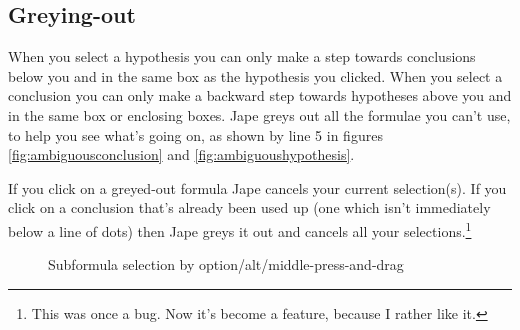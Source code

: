 \documentclass[11pt]{book}
\begin{document}
\subsection{Greying-out}

When you select a hypothesis you can only make a step towards conclusions below you and in the same box as the hypothesis you clicked. When you select a conclusion you can only make a backward step towards hypotheses above you and in the same box or enclosing boxes. Jape greys out all the formulae you can't use, to help you see what's going on, as shown by line 5 in figures \ref{fig:ambiguousconclusion} and \ref{fig:ambiguoushypothesis}. 

If you click on a greyed-out formula Jape cancels your current selection(s). If you click on a conclusion that's already been used up (one which isn't immediately below a line of dots) then Jape greys it out and cancels all your selections.\footnote{This was once a bug. Now it's become a feature, because I rather like it.}

\begin{figure}
\centering
{}
\quad
{}

\caption{Subformula selection by option/alt/middle-press-and-drag}
\end{figure}
\end{document}
